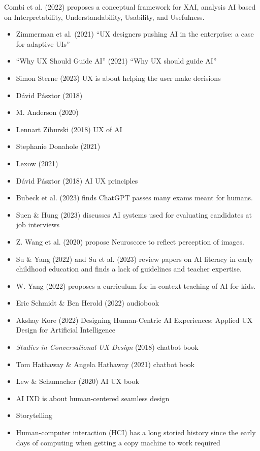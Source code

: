 \documentclass[
  letterpaper,
  DIV=11,
  numbers=noendperiod]{scrartcl}
\begin{document}
Combi et al. (2022) proposes a conceptual framework for XAI, analysis AI
based on Interpretability, Understandability, Usability, and Usefulness.

\begin{itemize}
\item
  Zimmerman et al. (2021) ``UX designers pushing AI in the enterprise: a
  case for adaptive UIs''
\item
  {``Why {UX} Should Guide {AI}''} (2021) ``Why UX should guide AI''
\item
  Simon Sterne (2023) UX is about helping the user make decisions
\item
  Dávid Pásztor (2018)
\item
  M. Anderson (2020)
\item
  Lennart Ziburski (2018) UX of AI
\item
  Stephanie Donahole (2021)
\item
  Lexow (2021)
\item
  Dávid Pásztor (2018) AI UX principles
\item
  Bubeck et al. (2023) finds ChatGPT passes many exams meant for humans.
\item
  Suen \& Hung (2023) discusses AI systems used for evaluating
  candidates at job interviews
\item
  Z. Wang et al. (2020) propose Neuroscore to reflect perception of
  images.
\item
  Su \& Yang (2022) and Su et al. (2023) review papers on AI literacy in
  early childhood education and finds a lack of guidelines and teacher
  expertise.
\item
  W. Yang (2022) proposes a curriculum for in-context teaching of AI for
  kids.
\item
  Eric Schmidt \& Ben Herold (2022) audiobook
\item
  Akshay Kore (2022) Designing Human-Centric AI Experiences: Applied UX
  Design for Artificial Intelligence
\item
  \emph{Studies in Conversational {UX} Design} (2018) chatbot book
\item
  Tom Hathaway \& Angela Hathaway (2021) chatbot book
\item
  Lew \& Schumacher (2020) AI UX book
\item
  AI IXD is about human-centered seamless design
\item
  Storytelling
\item
  Human-computer interaction (HCI) has a long storied history since the
  early days of computing when getting a copy machine to work required

\end{itemize}
\end{document}
